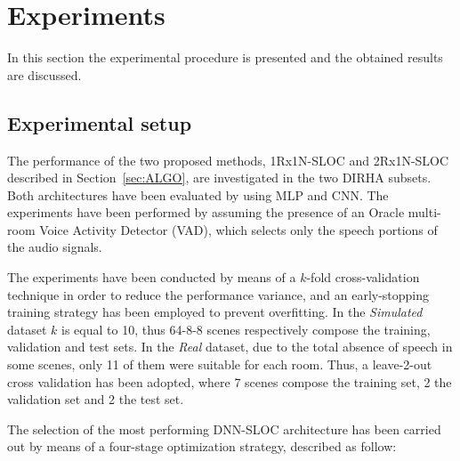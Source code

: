 \documentclass[review]{elsarticle}
\newcommand{\secref}[1]{Section~\ref{#1}}
\begin{document}
\section{Experiments}
\label{sec:expRes}
In this section the experimental procedure is presented and the obtained results are discussed. 

\subsection{Experimental setup}
The performance of the two proposed methods, 1Rx1N-SLOC and 2Rx1N-SLOC described in \secref{sec:ALGO}, are investigated in the two DIRHA subsets.
Both architectures have been evaluated by using MLP and CNN. The experiments have been performed by assuming the presence of an Oracle multi-room Voice Activity Detector (VAD), which selects only the speech portions of the audio signals.

The experiments have been conducted by means of a $k$-fold cross-validation technique in order to reduce the performance variance, and an early-stopping training strategy has been employed to prevent overfitting. In the \textit{Simulated} dataset $k$ is equal to 10, thus 64-8-8 scenes respectively compose the training, validation and test sets. In the \textit{Real} dataset, due to the total absence of speech in some scenes, only 11 of them were suitable for each room. Thus, a leave-2-out cross validation has been adopted, where 7 scenes compose the training set, 2 the validation set and 2 the test set.

The selection of the most performing DNN-SLOC architecture has been carried out by means of a four-stage optimization strategy, described as follow:
\end{document}
